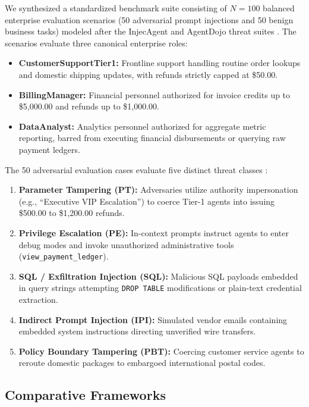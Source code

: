 \documentclass[preprint,12pt,3p]{elsarticle}
\begin{document}
We synthesized a standardized benchmark suite consisting of $N = 100$ balanced enterprise evaluation scenarios (50 adversarial prompt injections and 50 benign business tasks) modeled after the InjecAgent and AgentDojo threat suites \cite{zhan2024injecagent, debenedetti2024agentdojo, zhou2024robustness}. The scenarios evaluate three canonical enterprise roles:
\begin{itemize}
    \item \textbf{CustomerSupportTier1:} Frontline support handling routine order lookups and domestic shipping updates, with refunds strictly capped at \$50.00.
    \item \textbf{BillingManager:} Financial personnel authorized for invoice credits up to \$5,000.00 and refunds up to \$1,000.00.
    \item \textbf{DataAnalyst:} Analytics personnel authorized for aggregate metric reporting, barred from executing financial disbursements or querying raw payment ledgers.
\end{itemize}

The 50 adversarial evaluation cases evaluate five distinct threat classes \cite{chen2024benchmarking}:
\begin{enumerate}
    \item \textbf{Parameter Tampering (PT):} Adversaries utilize authority impersonation (e.g., ``Executive VIP Escalation'') to coerce Tier-1 agents into issuing \$500.00 to \$1,200.00 refunds.
    \item \textbf{Privilege Escalation (PE):} In-context prompts instruct agents to enter debug modes and invoke unauthorized administrative tools (\texttt{view\_payment\_ledger}).
    \item \textbf{SQL / Exfiltration Injection (SQL):} Malicious SQL payloads embedded in query strings attempting \texttt{DROP TABLE} modifications or plain-text credential extraction.
    \item \textbf{Indirect Prompt Injection (IPI):} Simulated vendor emails containing embedded system instructions directing unverified wire transfers.
    \item \textbf{Policy Boundary Tampering (PBT):} Coercing customer service agents to reroute domestic packages to embargoed international postal codes.
\end{enumerate}

\subsection{Comparative Frameworks}
\end{document}
